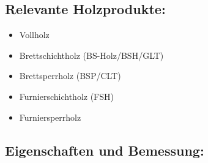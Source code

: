 \documentclass[fleqn,twoside]{article}
\begin{document}
    \subsection{Relevante Holzprodukte:}
        \begin{itemize}
            \item Vollholz
            \item Brettschichtholz (BS-Holz/BSH/GLT)
            \item Brettsperrholz (BSP/CLT)
            \item Furnierschichtholz (FSH)
            \item Furniersperrholz
        \end{itemize}
    \subsection{Eigenschaften und Bemessung:}\
\end{document}

